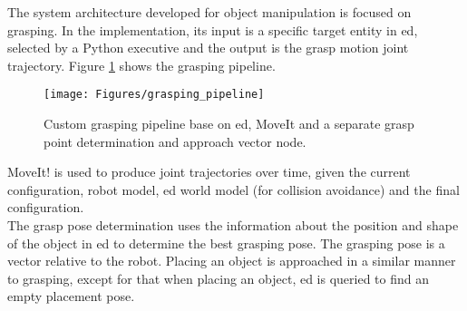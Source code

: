 The system architecture developed for object manipulation is focused on grasping. In the implementation, its input is a specific target entity in \acrshort{ed}, selected by a Python executive and the output is the grasp motion joint trajectory.
Figure \ref{fig:grasping_pipeline} shows the grasping pipeline.
\begin{figure}[H]
    \centering
	\texttt{[image: Figures/grasping\_pipeline]}
	\caption{Custom grasping pipeline base on \acrshort{ed}, MoveIt and a separate grasp point determination and approach vector node.}
	\label{fig:grasping_pipeline}
\end{figure}
MoveIt! is used to produce joint trajectories over time, given the current configuration, robot model, \acrshort{ed} world model (for collision avoidance) and the final configuration.
\\
\indent The grasp pose determination uses the information about the position and shape of the object in \acrshort{ed} to determine the best grasping pose.
The grasping pose is a vector relative to the robot.
Placing an object is approached in a similar manner to grasping, except for that when placing an object, \acrshort{ed} is queried to find an empty placement pose.

%
